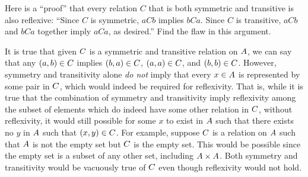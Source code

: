 \documentclass[../main.tex]{subfiles}
\begin{document}
\problem{}\label{s3p3}

Here is a ``proof'' that every relation \(C\) that is both symmetric and
transitive is also reflexive: ``Since \(C\) is symmetric, \(aCb\) implies
\(bCa\). Since \(C\) is transitive, \(aCb\) and \(bCa\) together imply \(aCa\),
as desired.'' Find the flaw in this argument.

\begin{remark}
	It is true that given \({C}\) is a symmetric and transitive
	relation on \({A}\), we can say that any
	\(({a},{b}) \in {C}\) implies
	\(({b},{a}) \in {C}\),
	\(({a},{a}) \in {C}\), and
	\(({b},{b}) \in {C}\). However, symmetry and
	transitivity alone \emph{do not} imply that every \(x \in {A}\)
	is represented by some pair in \({C}\), which would indeed
	be required for reflexivity. That is, while it is true that the
	combination of symmetry and transitivity imply reflexivity among the
	subset of elements which do indeed have some other relation in
	\({C}\), without reflexivity, it would still possible for
	some \(x\) to exist in \({A}\) such that there exists no \(y\) in
	\({A}\) such that \(({x},{y}) \in {C}\). For
	example, suppose \({C}\) is a relation on \({A}\)
	such that \({A}\) is not the empty set but \({C}\) is
	the empty set. This would be possible since the empty set is a subset of
	any other set, including
	\({{A}} \times {{A}}\). Both symmetry and
	transitivity would be vacuously true of \({C}\) even though
	reflexivity would not hold.
\end{remark}
\end{document}
